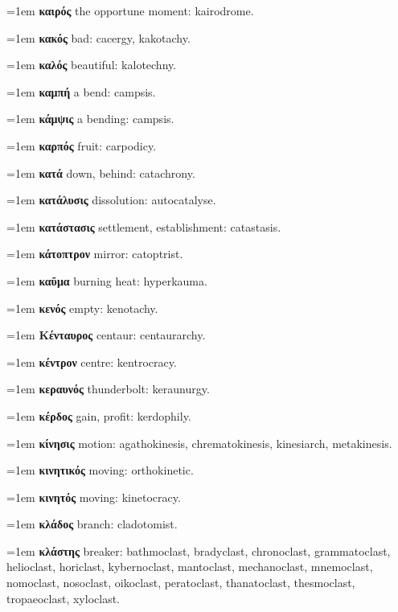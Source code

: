 \hangindent=1em \textbf{καιρός} the opportune moment: kairodrome.\par
\hangindent=1em \textbf{κακός} bad: cacergy, kakotachy.\par
\hangindent=1em \textbf{καλός} beautiful: kalotechny.\par
\hangindent=1em \textbf{καμπή} a bend: campsis.\par
\hangindent=1em \textbf{κάμψις} a bending: campsis.\par
\hangindent=1em \textbf{καρπός} fruit: carpodicy.\par
\hangindent=1em \textbf{κατά} down, behind: catachrony.\par
\hangindent=1em \textbf{κατάλυσις} dissolution: autocatalyse.\par
\hangindent=1em \textbf{κατάστασις} settlement, establishment: catastasis.\par
\hangindent=1em \textbf{κάτοπτρον} mirror: catoptrist.\par
\hangindent=1em \textbf{καῦμα} burning heat: hyperkauma.\par
\hangindent=1em \textbf{κενός} empty: kenotachy.\par
\hangindent=1em \textbf{Κένταυρος} centaur: centaurarchy.\par
\hangindent=1em \textbf{κέντρον} centre: kentrocracy.\par
\hangindent=1em \textbf{κεραυνός} thunderbolt: keraunurgy.\par
\hangindent=1em \textbf{κέρδος} gain, profit: kerdophily.\par
\hangindent=1em \textbf{κίνησις} motion: agathokinesis, chrematokinesis, kinesiarch, metakinesis.\par
\hangindent=1em \textbf{κινητικός} moving: orthokinetic.\par
\hangindent=1em \textbf{κινητός} moving: kinetocracy.\par
\hangindent=1em \textbf{κλάδος} branch: cladotomist.\par
\hangindent=1em \textbf{κλάστης} breaker: bathmoclast, bradyclast, chronoclast, grammatoclast, helioclast, horiclast, kybernoclast, mantoclast, mechanoclast, mnemoclast, nomoclast, nosoclast, oikoclast, peratoclast, thanatoclast, thesmoclast, tropaeoclast, xyloclast.\par
